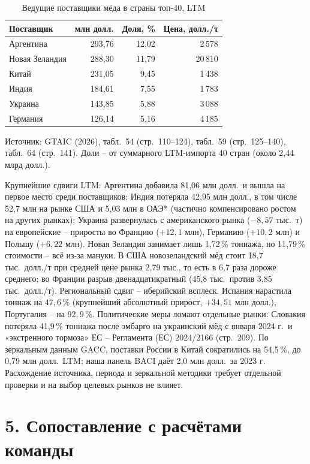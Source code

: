 \documentclass[11pt,a4paper]{article}
\begin{document}
\begin{table}[h]
\centering
\small
\caption{Ведущие поставщики мёда в страны топ-40, LTM}
\begin{tabular}{lrrr}
\toprule
Поставщик & млн долл. & Доля, \% & Цена, долл./т \\
\midrule
Аргентина & 293{,}76 & 12{,}02 & 2\,578 \\
Новая Зеландия & 288{,}30 & 11{,}79 & 20\,810 \\
Китай & 231{,}05 & 9{,}45 & 1\,438 \\
Индия & 184{,}61 & 7{,}55 & 1\,783 \\
Украина & 143{,}85 & 5{,}88 & 3\,088 \\
Германия & 126{,}14 & 5{,}16 & 4\,185 \\
\bottomrule
\end{tabular}

\noindent Источник: GTAIC (2026), табл.~54 (стр.~110--124), табл.~59 (стр.~125--140),
табл.~64 (стр.~141). Доли -- от суммарного LTM-импорта 40 стран (около 2{,}44 млрд долл.).
\end{table}

Крупнейшие сдвиги LTM: Аргентина добавила 81{,}06 млн долл.\ и вышла на первое место среди
поставщиков; Индия потеряла 42{,}95 млн долл., в том числе 52{,}7 млн на рынке США и 5{,}03 млн
в ОАЭ* (частично компенсировано ростом на других рынках); Украина развернулась с американского рынка ($-8{,}57$ тыс.~т) на
европейские -- приросты во Францию ($+12{,}1$ млн), Германию ($+10{,}2$ млн) и Польшу
($+6{,}22$ млн). Новая Зеландия занимает лишь 1{,}72\,\% тоннажа, но 11{,}79\,\% стоимости --
всё из-за мануки. В США новозеландский мёд стоит 18{,}7 тыс.\ долл./т при средней цене рынка
2{,}79 тыс., то есть в 6{,}7 раза дороже среднего; во Франции разрыв двенадцатикратный
(45{,}8 тыс.\ против 3{,}85 тыс.\ долл./т). Региональный сдвиг -- иберийский всплеск.
Испания нарастила тоннаж на $47{,}6\,\%$ (крупнейший абсолютный прирост, $+34{,}51$ млн
долл.), Португалия -- на $92{,}9\,\%$. Политические меры ломают отдельные рынки: Словакия потеряла 41{,}9\,\%
тоннажа после эмбарго на украинский мёд с января 2024 г.\ и «экстренного тормоза» ЕС --
Регламента (ЕС) 2024/2166 (стр.~209). По зеркальным данным GACC, поставки России в Китай
сократились на 54{,}5\,\%, до 0{,}79 млн долл.\ LTM; наша панель BACI даёт 2{,}0 млн долл.\
за 2023 г. Расхождение источника, периода и зеркальной методики требует отдельной проверки
и на выбор целевых рынков не влияет.

\section*{5. Сопоставление с расчётами команды}
\end{document}
